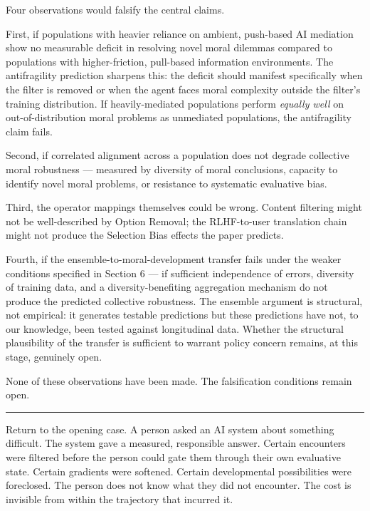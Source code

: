\documentclass[
]{article}
\begin{document}
Four observations would falsify the central claims.

First, if populations with heavier reliance on ambient, push-based AI
mediation show no measurable deficit in resolving novel moral dilemmas
compared to populations with higher-friction, pull-based information
environments. The antifragility prediction sharpens this: the deficit
should manifest specifically when the filter is removed or when the
agent faces moral complexity outside the filter's training distribution.
If heavily-mediated populations perform \emph{equally well} on
out-of-distribution moral problems as unmediated populations, the
antifragility claim fails.

Second, if correlated alignment across a population does not degrade
collective moral robustness --- measured by diversity of moral
conclusions, capacity to identify novel moral problems, or resistance to
systematic evaluative bias.

Third, the operator mappings themselves could be wrong. Content
filtering might not be well-described by Option Removal; the
RLHF-to-user translation chain might not produce the Selection Bias
effects the paper predicts.

Fourth, if the ensemble-to-moral-development transfer fails under the
weaker conditions specified in Section 6 --- if sufficient independence
of errors, diversity of training data, and a diversity-benefiting
aggregation mechanism do not produce the predicted collective
robustness. The ensemble argument is structural, not empirical: it
generates testable predictions but these predictions have not, to our
knowledge, been tested against longitudinal data. Whether the structural
plausibility of the transfer is sufficient to warrant policy concern
remains, at this stage, genuinely open.

None of these observations have been made. The falsification conditions
remain open.

\begin{center}\rule{0.5\linewidth}{0.5pt}\end{center}

Return to the opening case. A person asked an AI system about something
difficult. The system gave a measured, responsible answer. Certain
encounters were filtered before the person could gate them through their
own evaluative state. Certain gradients were softened. Certain
developmental possibilities were foreclosed. The person does not know
what they did not encounter. The cost is invisible from within the
trajectory that incurred it.
\end{document}
